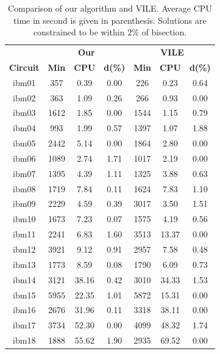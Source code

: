 \documentclass[journal]{IEEEtran}
\begin{document}
\begin{table}
\renewcommand{\arraystretch}{1.3}
\caption{Comparison of our algorithm and VILE. Average CPU time in
  second is given in parenthesis. Solutions 
  are constrained to be within 2\% of bisection.}
\label{vile}
\centering
\begin{tabular}{|c||c|c|c|c|c|c|}
\hline
 & \multicolumn{3}{c|}{\bfseries Our}
 & \multicolumn{3}{c|}{\bfseries VILE} \\
\cline{2-7}
\bfseries Circuit &  
\bfseries Min  &  \bfseries CPU  &  \bfseries d(\%) &
\bfseries Min  &  \bfseries CPU  &  \bfseries d(\%) \\
\hline\hline
ibm01 &  357 &   0.39 &   0.00 &   226 &   0.23 &   0.64   \\
ibm02 &  363 &   1.09 &   0.26 &   266 &   0.93 &   0.00   \\
ibm03 & 1612 &   1.85 &   0.00 &  1544 &   1.15 &   0.79   \\
ibm04 &  993 &   1.99 &   0.57 &  1397 &   1.07 &   1.88   \\
ibm05 & 2442 &   5.14 &   0.00 &  1864 &   2.80 &   0.00   \\
ibm06 & 1089 &   2.74 &   1.71 &  1017 &   2.19 &   0.00   \\
ibm07 & 1395 &   4.39 &   1.11 &  1325 &   3.88 &   0.63   \\
ibm08 & 1719 &   7.84 &   0.11 &  1624 &   7.83 &   1.10   \\
ibm09 & 2229 &   4.59 &   0.39 &  3017 &   3.50 &   1.51   \\
ibm10 & 1673 &   7.23 &   0.07 &  1575 &   4.19 &   0.56   \\
ibm11 & 2241 &   6.83 &   1.60 &  3513 &  13.37 &   0.00   \\
ibm12 & 3921 &   9.12 &   0.91 &  2957 &   7.58 &   0.48   \\
ibm13 & 1773 &   8.59 &   0.08 &  1790 &   6.09 &   0.73   \\
ibm14 & 3121 &  38.16 &   0.42 &  3010 &  34.33 &   1.53   \\
ibm15 & 5955 &  22.35 &   1.01 &  5872 &  15.31 &   0.00   \\
ibm16 & 2676 &  31.96 &   0.11 &  3318 &  38.11 &   0.00   \\
ibm17 & 3734 &  52.30 &   0.00 &  4099 &  48.32 &   1.74   \\
ibm18 & 1888 &  55.62 &   1.90 &  2935 &  69.52 &   0.00   \\
\hline
\end{tabular}
\end{table}
\end{document}
